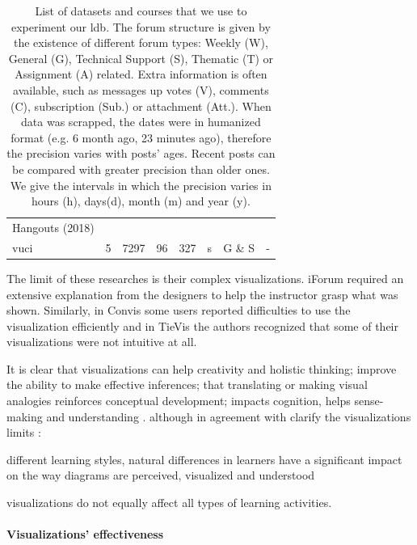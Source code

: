 \documentclass[a4paper,twoside]{article}
\begin{document}
\begin{table}[t]
\begin{tabular}{lllrrllp{}}
    Hangouts (2018) &  &  & \multicolumn{1}{l}{} & \multicolumn{1}{l}{} &  &  &  \\ [.2cm]
    \gls{vuci} & \multicolumn{1}{r}{5} & \multicolumn{1}{r}{7297} & 96 & 327 &  \multicolumn{1}{l}{s} & G \& S & -  \\   \bottomrule
  \end{tabular}
  \caption{\label{tab:datasets}List of datasets and courses that we use to experiment our \gls{ldb}.  The forum structure is given by the existence of different forum types: Weekly (W), General (G), Technical Support (S), Thematic (T) or Assignment (A) related.  Extra information is often available, such as messages up votes (V), comments (C), subscription (Sub.) or attachment (Att.).  When data was scrapped, the dates were in humanized format (e.g. 6 month ago, 23 minutes ago), therefore the precision varies with posts' ages.  Recent posts can be compared with greater precision than older ones. We give the intervals in which the precision varies in hours (h), days(d), month (m) and year (y).}
\end{table}


The limit of these researches is their complex visualizations.  iForum required an extensive explanation from the designers to help the instructor grasp what was shown.  Similarly, in Convis some users reported difficulties to use the visualization efficiently and in TieVis the authors recognized that some of their visualizations were not intuitive at all.

It is clear that visualizations can help creativity and holistic thinking; improve the ability to make effective inferences; that translating or making visual analogies reinforces conceptual development; impacts cognition, helps sense-making and understanding \citep{Klerkx2014}.  \cite{Twissell2014} although in agreement with \cite{Klerkx2014} clarify the visualizations limits : 
\begin{inparaenum}
\item different learning styles, natural differences in learners have a significant impact on the way diagrams are perceived, visualized and understood
\item visualizations do not equally affect all types of learning activities.
\end{inparaenum}


\paragraph{Visualizations' effectiveness}
\end{document}
